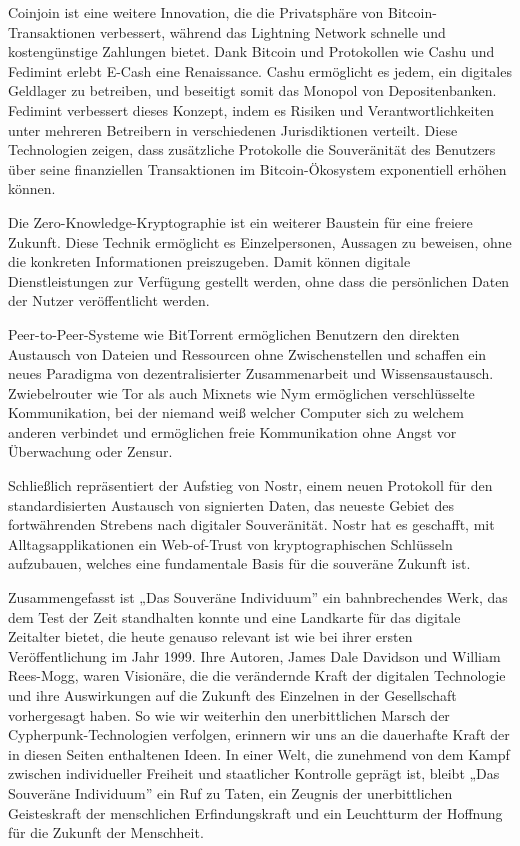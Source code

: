 \documentclass[
  a5paper,
  smalldemyvopaper,10pt,twoside,onecolumn,openright,extrafontsizes,hidelinks]{memoir}
\begin{document}
Coinjoin ist eine weitere Innovation, die die Privatsphäre von
Bitcoin-Transaktionen verbessert, während das Lightning Network schnelle
und kostengünstige Zahlungen bietet. Dank Bitcoin und Protokollen wie
Cashu und Fedimint erlebt E-Cash eine Renaissance. Cashu ermöglicht es
jedem, ein digitales Geldlager zu betreiben, und beseitigt somit das
Monopol von Depositenbanken. Fedimint verbessert dieses Konzept, indem
es Risiken und Verantwortlichkeiten unter mehreren Betreibern in
verschiedenen Jurisdiktionen verteilt. Diese Technologien zeigen, dass
zusätzliche Protokolle die Souveränität des Benutzers über seine
finanziellen Transaktionen im Bitcoin-Ökosystem exponentiell erhöhen
können.

Die Zero-Knowledge-Kryptographie ist ein weiterer Baustein für eine
freiere Zukunft. Diese Technik ermöglicht es Einzelpersonen, Aussagen zu
beweisen, ohne die konkreten Informationen preiszugeben. Damit können
digitale Dienstleistungen zur Verfügung gestellt werden, ohne dass die
persönlichen Daten der Nutzer veröffentlicht werden.

Peer-to-Peer-Systeme wie BitTorrent ermöglichen Benutzern den direkten
Austausch von Dateien und Ressourcen ohne Zwischenstellen und schaffen
ein neues Paradigma von dezentralisierter Zusammenarbeit und
Wissensaustausch. Zwiebelrouter wie Tor als auch Mixnets wie Nym
ermöglichen verschlüsselte Kommunikation, bei der niemand weiß welcher
Computer sich zu welchem anderen verbindet und ermöglichen freie
Kommunikation ohne Angst vor Überwachung oder Zensur.

Schließlich repräsentiert der Aufstieg von Nostr, einem neuen Protokoll
für den standardisierten Austausch von signierten Daten, das neueste
Gebiet des fortwährenden Strebens nach digitaler Souveränität. Nostr hat
es geschafft, mit Alltagsapplikationen ein Web-of-Trust von
kryptographischen Schlüsseln aufzubauen, welches eine fundamentale Basis
für die souveräne Zukunft ist.

Zusammengefasst ist „Das Souveräne Individuum'' ein bahnbrechendes Werk,
das dem Test der Zeit standhalten konnte und eine Landkarte für das
digitale Zeitalter bietet, die heute genauso relevant ist wie bei ihrer
ersten Veröffentlichung im Jahr 1999. Ihre Autoren, James Dale Davidson
und William Rees-Mogg, waren Visionäre, die die verändernde Kraft der
digitalen Technologie und ihre Auswirkungen auf die Zukunft des
Einzelnen in der Gesellschaft vorhergesagt haben. So wie wir weiterhin
den unerbittlichen Marsch der Cypherpunk-Technologien verfolgen,
erinnern wir uns an die dauerhafte Kraft der in diesen Seiten
enthaltenen Ideen. In einer Welt, die zunehmend von dem Kampf zwischen
individueller Freiheit und staatlicher Kontrolle geprägt ist, bleibt
„Das Souveräne Individuum'' ein Ruf zu Taten, ein Zeugnis der
unerbittlichen Geisteskraft der menschlichen Erfindungskraft und ein
Leuchtturm der Hoffnung für die Zukunft der Menschheit.
\end{document}
